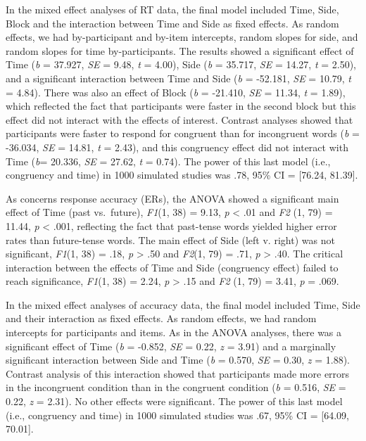 \documentclass[
  a4paper,12pt,twoside,onecolumn,openright,final,oldfontcommands]{memoir}
\begin{document}
In the mixed effect analyses of RT data, the final model included Time, Side, Block and the interaction between Time and Side as fixed effects. As random effects, we had by-participant and by-item intercepts, random slopes for side, and random slopes for time by-participants. The results showed a significant effect of Time (\emph{b} = 37.927, \emph{SE} = 9.48, \emph{t} = 4.00), Side (\emph{b} = 35.717, \emph{SE} = 14.27, \emph{t} = 2.50), and a significant interaction between Time and Side (\emph{b} = -52.181, \emph{SE} = 10.79, \emph{t} = 4.84). There was also an effect of Block (\emph{b} = -21.410, \emph{SE} = 11.34, \emph{t} = 1.89), which reflected the fact that participants were faster in the second block but this effect did not interact with the effects of interest. Contrast analyses showed that participants were faster to respond for congruent than for incongruent words (\emph{b} = -36.034, \emph{SE} = 14.81, \emph{t} = 2.43), and this congruency effect did not interact with Time (\emph{b}= 20.336, \emph{SE} = 27.62, \emph{t} = 0.74). The power of this last model (i.e., congruency and time) in 1000 simulated studies was .78, 95\% CI = {[}76.24, 81.39{]}.

As concerns response accuracy (ERs), the ANOVA showed a significant main effect of Time (past vs.~future), \emph{F1}(1, 38) = 9.13, \emph{p} \textless{} .01 and \emph{F2} (1, 79) = 11.44, \emph{p} \textless{} .001, reflecting the fact that past-tense words yielded higher error rates than future-tense words. The main effect of Side (left v. right) was not significant, \emph{F1}(1, 38) = .18, \emph{p} \textgreater{} .50 and \emph{F2}(1, 79) = .71, \emph{p} \textgreater{} .40. The critical interaction between the effects of Time and Side (congruency effect) failed to reach significance, \emph{F1}(1, 38) = 2.24, \emph{p} \textgreater{} .15 and \emph{F2} (1, 79) = 3.41, \emph{p} = .069.

In the mixed effect analyses of accuracy data, the final model included Time, Side and their interaction as fixed effects. As random effects, we had random intercepts for participants and items. As in the ANOVA analyses, there was a significant effect of Time (\emph{b} = -0.852, \emph{SE} = 0.22, \emph{z} = 3.91) and a marginally significant interaction between Side and Time (\emph{b} = 0.570, \emph{SE} = 0.30, \emph{z} = 1.88). Contrast analysis of this interaction showed that participants made more errors in the incongruent condition than in the congruent condition (\emph{b} = 0.516, \emph{SE} = 0.22, \emph{z} = 2.31). No other effects were significant. The power of this last model (i.e., congruency and time) in 1000 simulated studies was .67, 95\% CI = {[}64.09, 70.01{]}.
\end{document}
